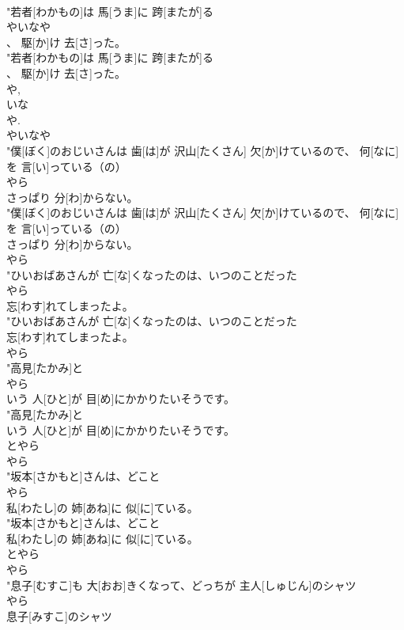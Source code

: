 \documentclass[8pt]{extreport}
\begin{document}
\begin{CJK}{UTF8}{min}
\\	"若者[わかもの]は 馬[うま]に 跨[またが]る
\\	やいなや
\\	、 駆[か]け 去[さ]った。
\\	"若者[わかもの]は 馬[うま]に 跨[またが]る
\\	、 駆[か]け 去[さ]った。
\\	や, 
\\	いな 
\\	や.	
\\	やいなや
\\	"僕[ぼく]のおじいさんは 歯[は]が 沢山[たくさん] 欠[か]けているので、 何[なに]を 言[い]っている（の）
\\	やら
\\	さっぱり 分[わ]からない。
\\	"僕[ぼく]のおじいさんは 歯[は]が 沢山[たくさん] 欠[か]けているので、 何[なに]を 言[い]っている（の）
\\	さっぱり 分[わ]からない。
\\	やら
\\	"ひいおばあさんが 亡[な]くなったのは、いつのことだった
\\	やら
\\	忘[わす]れてしまったよ。
\\	"ひいおばあさんが 亡[な]くなったのは、いつのことだった
\\	忘[わす]れてしまったよ。
\\	やら
\\	"高見[たかみ]と
\\	やら
\\	いう 人[ひと]が 目[め]にかかりたいそうです。
\\	"高見[たかみ]と
\\	いう 人[ひと]が 目[め]にかかりたいそうです。
\\	とやら	
\\	やら
\\	"坂本[さかもと]さんは、どこと
\\	やら
\\	私[わたし]の 姉[あね]に 似[に]ている。
\\	"坂本[さかもと]さんは、どこと
\\	私[わたし]の 姉[あね]に 似[に]ている。
\\	とやら	
\\	やら
\\	"息子[むすこ]も 大[おお]きくなって、どっちが 主人[しゅじん]のシャツ
\\	やら
\\	息子[みすこ]のシャツ

\end{CJK}
\end{document}
